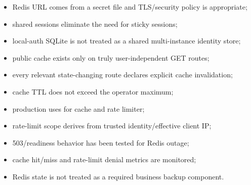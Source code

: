 \begin{itemize}
  \item Redis URL comes from a secret file and TLS/security policy is appropriate;
  \item shared sessions eliminate the need for sticky sessions;
  \item local-auth SQLite is not treated as a shared multi-instance identity store;
  \item public cache exists only on truly user-independent GET routes;
  \item every relevant state-changing route declares explicit cache invalidation;
  \item cache TTL does not exceed the operator maximum;
  \item production uses  for cache and rate limiter;
  \item rate-limit scope derives from trusted identity/effective client IP;
  \item 503/readiness behavior has been tested for Redis outage;
  \item cache hit/miss and rate-limit denial metrics are monitored;
  \item Redis state is not treated as a required business backup component.
\end{itemize}
